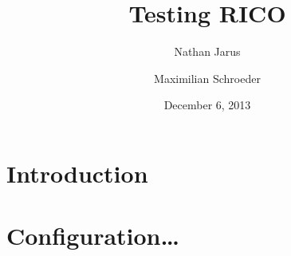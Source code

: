 \documentclass{article}
\title{Testing RICO}
\date{December 6, 2013}
\author{Nathan Jarus \and Maximilian Schroeder}
\begin{document}
\section{Introduction}
\section{Configuration\ldots}
\end{document}
